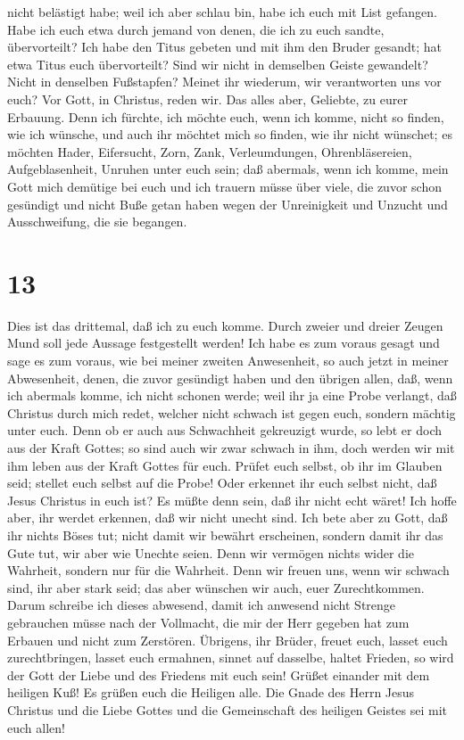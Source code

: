 nicht belästigt habe; weil ich aber schlau bin, habe ich euch mit List
gefangen.  Habe ich euch etwa durch jemand von denen, die
ich zu euch sandte, übervorteilt?  Ich habe den Titus
gebeten und mit ihm den Bruder gesandt; hat etwa Titus euch
übervorteilt? Sind wir nicht in demselben Geiste gewandelt? Nicht in
denselben Fußstapfen?  Meinet ihr wiederum, wir
verantworten uns vor euch? Vor Gott, in Christus, reden wir. Das alles
aber, Geliebte, zu eurer Erbauung.  Denn ich fürchte, ich
möchte euch, wenn ich komme, nicht so finden, wie ich wünsche, und auch
ihr möchtet mich so finden, wie ihr nicht wünschet; es möchten Hader,
Eifersucht, Zorn, Zank, Verleumdungen, Ohrenbläsereien, Aufgeblasenheit,
Unruhen unter euch sein;  daß abermals, wenn ich komme,
mein Gott mich demütige bei euch und ich trauern müsse über viele, die
zuvor schon gesündigt und nicht Buße getan haben wegen der Unreinigkeit
und Unzucht und Ausschweifung, die sie begangen.

\hypertarget{section-12}{%
\section{13}\label{section-12}}

 Dies ist das drittemal, daß ich zu euch komme. Durch
zweier und dreier Zeugen Mund soll jede Aussage festgestellt werden!
 Ich habe es zum voraus gesagt und sage es zum voraus, wie
bei meiner zweiten Anwesenheit, so auch jetzt in meiner Abwesenheit,
denen, die zuvor gesündigt haben und den übrigen allen, daß, wenn ich
abermals komme, ich nicht schonen werde;  weil ihr ja eine
Probe verlangt, daß Christus durch mich redet, welcher nicht schwach ist
gegen euch, sondern mächtig unter euch.  Denn ob er auch
aus Schwachheit gekreuzigt wurde, so lebt er doch aus der Kraft Gottes;
so sind auch wir zwar schwach in ihm, doch werden wir mit ihm leben aus
der Kraft Gottes für euch.  Prüfet euch selbst, ob ihr im
Glauben seid; stellet euch selbst auf die Probe! Oder erkennet ihr euch
selbst nicht, daß Jesus Christus in euch ist? Es müßte denn sein, daß
ihr nicht echt wäret!  Ich hoffe aber, ihr werdet
erkennen, daß wir nicht unecht sind.  Ich bete aber zu
Gott, daß ihr nichts Böses tut; nicht damit wir bewährt erscheinen,
sondern damit ihr das Gute tut, wir aber wie Unechte seien.
 Denn wir vermögen nichts wider die Wahrheit, sondern nur
für die Wahrheit.  Denn wir freuen uns, wenn wir schwach
sind, ihr aber stark seid; das aber wünschen wir auch, euer
Zurechtkommen.  Darum schreibe ich dieses abwesend, damit
ich anwesend nicht Strenge gebrauchen müsse nach der Vollmacht, die mir
der Herr gegeben hat zum Erbauen und nicht zum Zerstören.
 Übrigens, ihr Brüder, freuet euch, lasset euch
zurechtbringen, lasset euch ermahnen, sinnet auf dasselbe, haltet
Frieden, so wird der Gott der Liebe und des Friedens mit euch sein!
 Grüßet einander mit dem heiligen Kuß!  Es
grüßen euch die Heiligen alle.  Die Gnade des Herrn Jesus
Christus und die Liebe Gottes und die Gemeinschaft des heiligen Geistes
sei mit euch allen!
